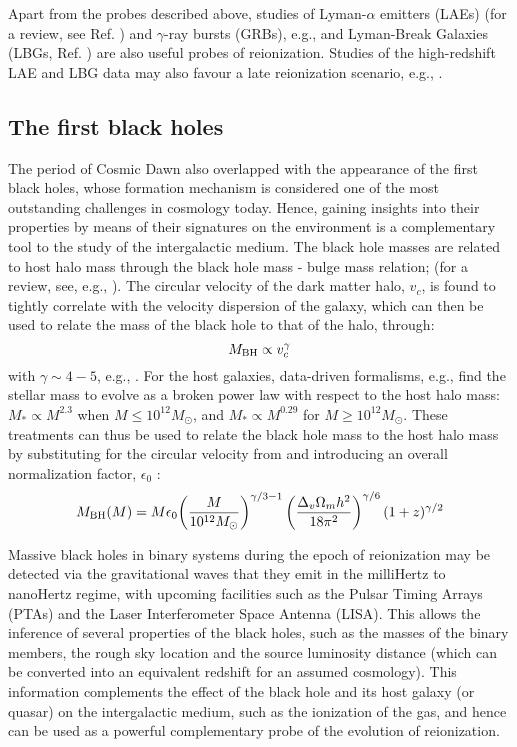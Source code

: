 Apart from the probes described above, studies of Lyman-$\alpha$ emitters (LAEs) (for a review, see Ref. \cite{ouchi2019}) and $\gamma$-ray bursts (GRBs), e.g., \cite{totani2006, kistler2009, ishida2011,robertsonellis2012, lidz2021a} and Lyman-Break Galaxies (LBGs, Ref. \cite{kashino2020}) are also useful probes of reionization. Studies of the high-redshift LAE and LBG data may also favour a late reionization scenario, e.g., \cite{choudhury2015, mesinger2015, kashino2020}. 


\subsection{The first black holes}
\label{sec:firstbh}

The period of Cosmic Dawn also overlapped with the appearance of the first black holes, whose formation mechanism is considered one of the most outstanding challenges in cosmology today. Hence, gaining insights into their properties by means of their signatures on the environment is a complementary tool to the study of the intergalactic medium. The black hole masses are related to host halo mass through the black hole mass - bulge mass relation; (for a review, see, e.g.,  \cite{kormendy2013}).
The circular velocity of the dark matter halo, $v_{c}$, is found to tightly correlate with the velocity dispersion of the galaxy, which can then be used to relate the mass of the black hole to that of the halo, through:
\begin{equation}
    M_{\rm BH} \propto v_c^{\gamma} 
\end{equation}
with $\gamma \sim 4-5$, e.g., \cite{wyithe2002}. For the host galaxies, data-driven formalisms, e.g., \cite{behroozi2010} find the stellar mass to evolve as a broken power law with respect to the host halo mass:  $M_* \propto M^{2.3}$
when $M \leq 10^{12} M_{\odot}$, and 
$M_* \propto M^{0.29}$
for $M
\geq 10^{12} M_{\odot}$. These treatments can thus be used to relate the black hole mass to the host halo mass by substituting for the circular velocity from  and introducing an overall normalization factor, $\epsilon_0$ \cite{wyithe2002}:
\begin{equation}
    M_{\rm BH} (M) = M \epsilon_0 \displaystyle{\left(\frac{M}{10^{12} M_{\odot}}\right)^{\gamma/3 - 
1}} \left(\frac{\Delta_v \Omega_m h^2}{18 \pi^2}\right)^{\gamma/6} 
(1+z)^{\gamma/2} 
\end{equation}

Massive black holes in binary systems during the epoch of reionization may be detected via the gravitational waves that they emit in the milliHertz to nanoHertz regime, with upcoming facilities such as the Pulsar Timing Arrays (PTAs) and the Laser Interferometer Space Antenna (LISA).  This allows the inference of several properties of the black holes, such as the masses of the binary members, the rough sky location and the source luminosity distance (which can be converted into an equivalent redshift for an assumed cosmology). This information complements the effect of the black hole and its host galaxy (or quasar) on the intergalactic medium, such as the ionization of the gas, and hence can be used as a powerful complementary probe of the evolution of reionization.

